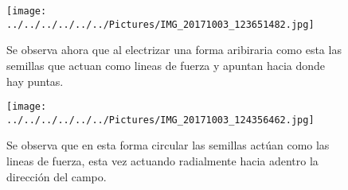 \documentclass[11pt,a4paper]{article}
\begin{document}
\begin{figure}[hbtp]
\centering
\texttt{[image: ../../../../../../Pictures/IMG\_20171003\_123651482.jpg]} 
\caption{Se observa ahora que al electrizar una forma aribiraria como esta las semillas que actuan como lineas de fuerza y apuntan hacia donde hay puntas.
}
\end{figure}

\begin{figure}[hbtp]
\centering
\texttt{[image: ../../../../../../Pictures/IMG\_20171003\_124356462.jpg]} 
\caption{Se observa que en esta forma circular las semillas act\'{u}an como las lineas de fuerza, esta vez actuando radialmente hacia adentro la direcci\'{o}n del campo.}
\end{figure}


\pagebreak
\end{document}
